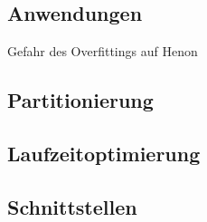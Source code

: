 \subsection{Anwendungen}
Gefahr des Overfittings auf Henon
\subsection{Partitionierung}

\subsection{Laufzeitoptimierung}

\subsection{Schnittstellen}


